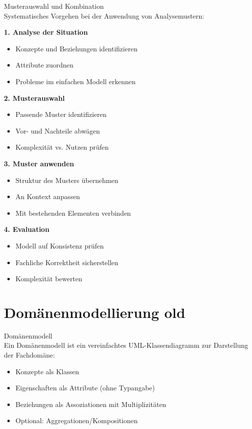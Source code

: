 \begin{KR}{Musterauswahl und Kombination}\\
Systematisches Vorgehen bei der Anwendung von Analysemustern:

\textbf{1. Analyse der Situation}
\begin{itemize}
    \item Konzepte und Beziehungen identifizieren
    \item Attribute zuordnen
    \item Probleme im einfachen Modell erkennen
\end{itemize}

\textbf{2. Musterauswahl}
\begin{itemize}
    \item Passende Muster identifizieren
    \item Vor- und Nachteile abwägen
    \item Komplexität vs. Nutzen prüfen
\end{itemize}

\textbf{3. Muster anwenden}
\begin{itemize}
    \item Struktur des Musters übernehmen
    \item An Kontext anpassen
    \item Mit bestehenden Elementen verbinden
\end{itemize}

\textbf{4. Evaluation}
\begin{itemize}
    \item Modell auf Konsistenz prüfen
    \item Fachliche Korrektheit sicherstellen
    \item Komplexität bewerten
\end{itemize}
\end{KR}

\pagebreak

\section{Domänenmodellierung old}

\begin{concept}{Domänenmodell}\\
Ein Domänenmodell ist ein vereinfachtes UML-Klassendiagramm zur Darstellung der Fachdomäne:
\begin{itemize}
    \item Konzepte als Klassen
    \item Eigenschaften als Attribute (ohne Typangabe)
    \item Beziehungen als Assoziationen mit Multiplizitäten
    \item Optional: Aggregationen/Kompositionen
\end{itemize}
\end{concept}


